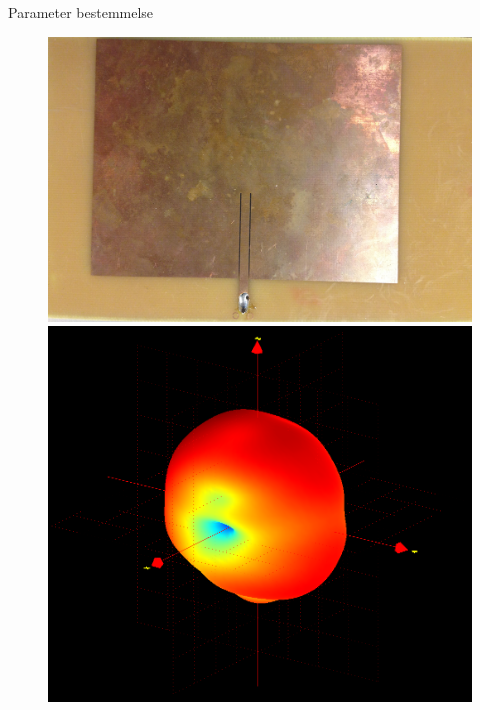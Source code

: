 \begin{frame}{Parameter bestemmelse}
\begin{minipage}{0.45\textwidth}
\begin{figure}[!htbp]
	\centering
	\includegraphics[width = \columnwidth]{figures/PatchAnt.jpg}\\
	\includegraphics[width = \columnwidth]{figures/PatchNy858.png}
\end{figure}
\end{minipage}
\end{frame}

